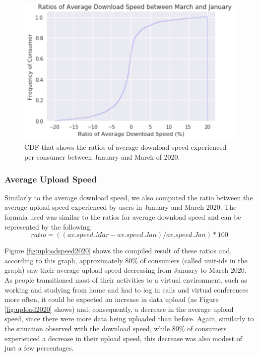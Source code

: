 \documentclass[conference,10pt]{IEEEtran}
\begin{document}
\begin{figure}
\centering
\includegraphics[width=1.0\linewidth]{figs/downspeed.PNG}
\caption{CDF that shows the ratios of average download speed experienced per consumer between January and March of 2020.}
\label{fig:downloadspeed2020}
\end{figure}

\subsubsection{Average Upload Speed}
\label{sec:average-upload-speed}
Similarly to the average download speed, we also computed the ratio between the average upload speed experienced by users in January and March 2020. The formula used was similar to the ratios for average download speed and can be represented by the following:
\begin{equation}
ratio= ((av.speed.Mar - av.speed.Jan)/ av.speed.Jan)*100
\end{equation}

Figure \ref{fig:uploadspeed2020} shows the compiled result of these ratios and, according to this graph, approximately 80\% of consumers (called unit-ids in the graph) saw their average upload speed decreasing from January to March 2020. As people transitioned most of their activities to a virtual environment, such as working and studying from home and had to log in calls and virtual conferences more often, it could be expected an increase in data upload (as Figure \ref{fig:upload2020} shows) and, consequently, a decrease in the average upload speed, since there were more data being uploaded than before. Again, similarly to the situation observed with the download speed, while 80\% of consumers experienced a decrease in their upload speed, this decrease was also modest of just a few percentages.
\end{document}
